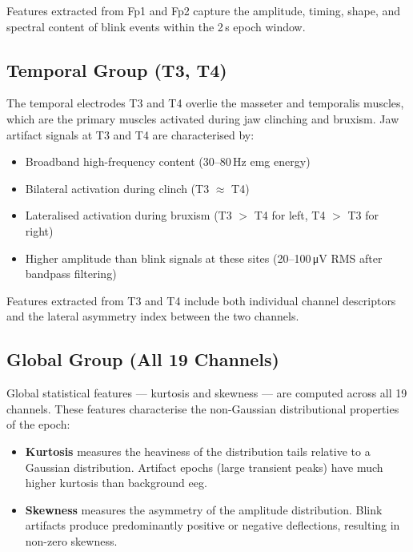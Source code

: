Features extracted from Fp1 and Fp2 capture the amplitude,
timing, shape, and spectral content of blink events within
the 2\,s epoch window.

\subsection{Temporal Group (T3, T4)}

The temporal electrodes T3 and T4 overlie the masseter and
temporalis muscles, which are the primary muscles activated
during jaw clinching and bruxism. Jaw artifact signals at
T3 and T4 are characterised by:

\begin{itemize}[leftmargin=*]
    \item Broadband high-frequency content
    (30--80\,Hz \acrshort{emg} energy)
    \item Bilateral activation during clinch (T3
    $\approx$ T4)
    \item Lateralised activation during bruxism
    (T3 $>$ T4 for left, T4 $>$ T3 for right)
    \item Higher amplitude than blink signals
    at these sites (20--100\,\si{\micro\volt} RMS
    after bandpass filtering)
\end{itemize}

Features extracted from T3 and T4 include both individual
channel descriptors and the lateral asymmetry index between
the two channels.

\subsection{Global Group (All 19 Channels)}

Global statistical features — kurtosis and skewness — are
computed across all 19 channels. These features characterise
the non-Gaussian distributional properties of the epoch:

\begin{itemize}[leftmargin=*]
    \item \textbf{Kurtosis} measures the heaviness of the
    distribution tails relative to a Gaussian distribution.
    Artifact epochs (large transient peaks) have much higher
    kurtosis than background \acrshort{eeg}.
    \item \textbf{Skewness} measures the asymmetry of the
    amplitude distribution. Blink artifacts produce
    predominantly positive or negative deflections, resulting
    in non-zero skewness.
\end{itemize}

